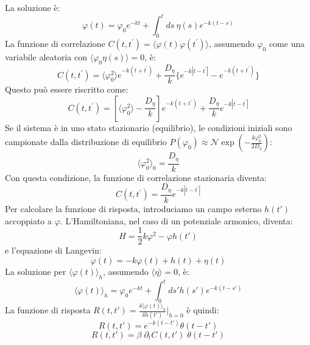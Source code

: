La soluzione è:
\begin{equation}
\varphi(t)=\varphi_{0}e^{-kt}+\int_{0}^{t}ds~\eta(s)e^{-k(t-s)}
\end{equation}
La funzione di correlazione $C(t,t^{\prime})=\langle\varphi(t)\varphi(t^{\prime})\rangle$, assumendo $\varphi_0$ come una variabile aleatoria con $\langle \varphi_0 \eta(s) \rangle = 0$, è:
\begin{equation}
C(t,t^{\prime}) = \langle\varphi_{0}^{2}\rangle e^{-k(t+t^{\prime})} + \frac{D_{\eta}}{k}\{e^{-k|t-t^{\prime}|}-e^{-k(t+t^{\prime})}\}
\end{equation}
Questo può essere riscritto come:
\begin{equation}
C(t,t^{\prime}) = \left[\langle\varphi_{0}^{2}\rangle-\frac{D_{\eta}}{k}\right]e^{-k(t+t^{\prime})}+\frac{D_{\eta}}{k}e^{-k|t-t^{\prime}|}
\end{equation}
Se il sistema è in uno stato stazionario (equilibrio), le condizioni iniziali sono campionate dalla distribuzione di equilibrio $P(\varphi_0) \approx \mathcal{N} \exp{\left(-\frac{k \varphi_0^2}{2D_{\eta}}\right)}$:
\begin{equation}
\langle\varphi_0^2\rangle_0 = \frac{D_{\eta}}{k} 
\end{equation}
Con questa condizione, la funzione di correlazione stazionaria diventa:
\begin{equation}
C(t,t^{\prime})=\frac{D_{\eta}}{k}e^{-k|t-t^{\prime}|}
\end{equation}
Per calcolare la funzione di risposta, introduciamo un campo esterno $h(t')$ accoppiato a $\varphi$.
L'Hamiltoniana, nel caso di un potenziale armonico, diventa:
\begin{equation} 
H= \frac{1}{2}k\varphi^2 - \varphi h(t')
\end{equation}
e l'equazione di Langevin:
\begin{equation}
\dot{\varphi}(t)=-k\varphi(t)+h(t)+\eta(t)
\end{equation}
La soluzione per $\langle \varphi(t) \rangle_h$, assumendo $\langle \eta \rangle = 0$, è:
\begin{equation}
\langle\varphi(t)\rangle_{h}= \varphi_{0} e^{-kt} +\int_{0}^{t}ds' h(s')e^{-k(t-s')}
\end{equation}
La funzione di risposta $R(t,t') = \frac{\delta\langle\varphi(t)\rangle_h}{\delta h(t')}\bigg|_{h=0}$ è quindi:
\begin{equation}
R(t,t')=e^{-k(t-t')}\theta(t-t')
\end{equation}
\begin{equation}
R(t,t')=\beta \; \partial_t C(t, t')\; \theta(t-t')
\end{equation}

